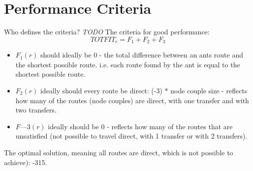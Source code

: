 \section{Performance Criteria}
Who defines the criteria?\emph{\color{red} TODO}
The criteria for good performance:
$$TOTFIT_{r} = F_{1} + F_{2} + F_{3}$$
\begin{itemize}
\item $F_{1}(r)$ should ideally be 0 -  the total difference between an ants route and the shortest possible route. i.e. each route found by the ant is equal to the shortest possible route.
\item $F_{2}(r)$ ideally should every route be direct: (-3) * node couple size - reflects how many of the routes (node couples) are direct, with one transfer and with two transfers.  
\item $F—{3}(r)$ ideally should be 0 - reflects how many of the routes that are unsatisfied (not possible to travel direct, with 1 transfer or with 2 transfers). 
\end{itemize}

The optimal solution, meaning all routes are direct, which is not possible to achieve): -315.